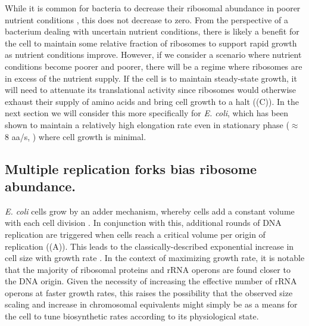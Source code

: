 While it is common for bacteria to decrease their ribosomal abundance in poorer
nutrient conditions \cite{scott2010, liebermeister2014}, this does not decrease
to zero. From the perspective of a bacterium dealing with uncertain nutrient
conditions, there is likely a benefit for the cell to maintain some relative
fraction of ribosomes to support rapid growth as nutrient conditions improve.
However, if we consider a scenario where nutrient conditions become poorer and
poorer, there will be a regime where ribosomes are in excess of the nutrient
supply. If the cell is to maintain steady-state growth, it will need to
attenuate its translational activity since ribosomes would otherwise exhaust
their supply of amino acids and bring cell growth to a halt
((C)). In the next section we will consider this more
specifically for \textit{E. coli}, which has been shown to maintain a relatively
high elongation rate even in stationary phase ($\approx$ 8 aa/s, \cite{dai2016})
where cell growth is minimal.


\subsection{Multiple replication forks bias ribosome abundance.}

\textit{E. coli} cells grow by an adder mechanism, whereby cells add a constant
volume with each cell division \citep{taheriaraghi2015}. In conjunction with
this, additional rounds of DNA replication are triggered when cells reach a
critical volume per origin of replication ((A)). This
leads to the classically-described exponential increase in cell size with growth
rate \cite{schaechter1958, si2017, si2019}. In the context of maximizing growth
rate, it is notable that the majority of ribosomal proteins and rRNA operons are
found closer to the DNA origin. Given the necessity of increasing the effective
number of rRNA operons at faster growth rates, this raises the possibility that the
observed size scaling and increase in chromosomal equivalents might simply be
as a means for the cell to tune biosynthetic rates according to its
physiological state.

